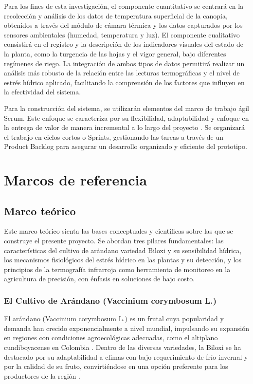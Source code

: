 Para los fines de esta investigación, el componente cuantitativo se centrará en la recolección y análisis de los datos de temperatura superficial de la canopia, obtenidos a través del módulo de cámara térmica y los datos capturados por los sensores ambientales (humedad, temperatura y luz). El componente cualitativo consistirá en el registro y la descripción de los indicadores visuales del estado de la planta, como la turgencia de las hojas y el vigor general, bajo diferentes regímenes de riego. La integración de ambos tipos de datos permitirá realizar un análisis más robusto de la relación entre las lecturas termográficas y el nivel de estrés hídrico aplicado, facilitando la comprensión de los factores que influyen en la efectividad del sistema.

Para la construcción del sistema, se utilizarán elementos del marco de trabajo ágil Scrum. Este enfoque se caracteriza por su flexibilidad, adaptabilidad y enfoque en la entrega de valor de manera incremental a lo largo del proyecto . Se organizará el trabajo en ciclos cortos o Sprints, gestionando las tareas a través de un Product Backlog para asegurar un desarrollo organizado y eficiente del prototipo.


\section{Marcos de referencia}
\subsection{Marco teórico}
\label{subsec:marco_teorico}

Este marco teórico sienta las bases conceptuales y científicas sobre las que se construye el presente proyecto. Se abordan tres pilares fundamentales: las características del cultivo de arándano variedad Biloxi y su sensibilidad hídrica, los mecanismos fisiológicos del estrés hídrico en las plantas y su detección, y los principios de la termografía infrarroja como herramienta de monitoreo en la agricultura de precisión, con énfasis en soluciones de bajo costo.

\subsubsection{El Cultivo de Arándano (Vaccinium corymbosum L.)}
\label{ssubsec:arandano}

El arándano (Vaccinium corymbosum L.) es un frutal cuya popularidad y demanda han crecido exponencialmente a nivel mundial, impulsando su expansión en regiones con condiciones agroecológicas adecuadas, como el altiplano cundiboyacense en Colombia . Dentro de las diversas variedades, la Biloxi se ha destacado por su adaptabilidad a climas con bajo requerimiento de frío invernal y por la calidad de su fruto, convirtiéndose en una opción preferente para los productores de la región .

